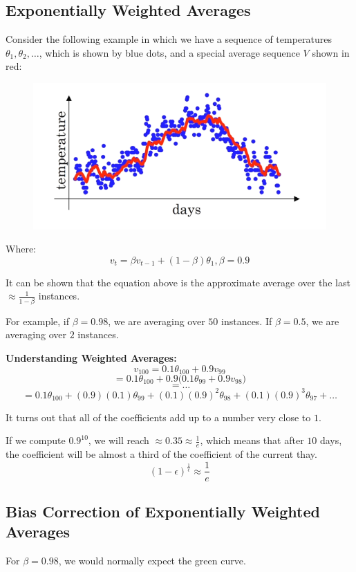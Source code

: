 \subsection{Exponentially Weighted Averages}
Consider the following example in which we have a sequence of temperatures $\theta_1, \theta_2, \dots$, which is shown by blue dots, and a special average sequence $V$ shown in red: 
\begin{figure}[H]
    \includegraphics[scale=0.35]{images/avg.png}
    \centering
\end{figure}
Where: 
$$
v_t = \beta v_{t-1} + (1-\beta)\theta_1, \beta = 0.9
$$

It can be shown that the equation above is the approximate average over the last $\approx \frac{1}{1-\beta}$ instances. 

For example, if $\beta=0.98$, we are averaging over $50$ instances. If $\beta=0.5$, we are averaging over $2$ instances. 

\textbf{Understanding Weighted Averages:}
$$
v_{100} = 0.1\theta_{100} + 0.9v_{99}
$$
$$
= 0.1\theta_{100} + 0.9\Big(0.1\theta_{99} + 0.9v_{98}\Big)
$$
$$
= \dots
$$
$$
=0.1\theta_{100} + (0.9)(0.1)\theta_{99} + (0.1)(0.9)^2\theta_{98}+(0.1)(0.9)^3\theta_{97}+\dots
$$

It turns out that all of the coefficients add up to a number very close to $1$. 

If we compute $0.9^10$, we will reach $\approx 0.35 \approx \frac{1}{e}$, which means that after $10$ days, the coefficient will be almost a third of the coefficient of the current thay. 
$$
(1-\epsilon)^{\frac{1}{\epsilon}} \approx \frac{1}{e}
$$

\subsection{Bias Correction of Exponentially Weighted Averages}
For $\beta=0.98$, we would normally expect the green curve. 

